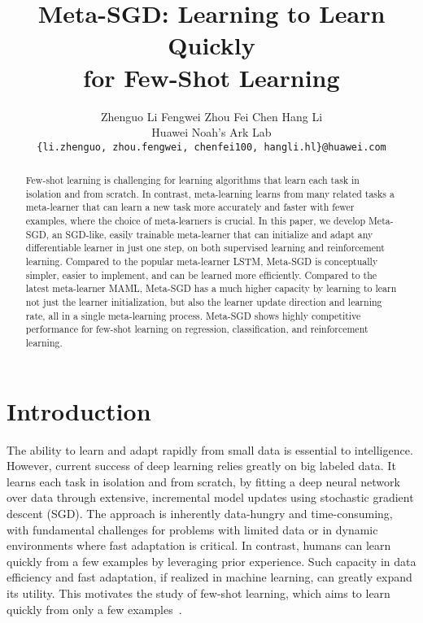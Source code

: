 \documentclass{article}
\title{Meta-SGD: Learning to Learn Quickly\\ for Few-Shot Learning}
\author{
  Zhenguo Li \hspace{0.8cm} Fengwei Zhou \hspace{0.8cm} Fei Chen \hspace{0.8cm} Hang Li 
\\ 
  Huawei Noah's Ark Lab\\
\texttt{\{li.zhenguo, zhou.fengwei, chenfei100, hangli.hl\}@huawei.com} \\
}
\begin{document}
\maketitle



\begin{abstract}
Few-shot learning is challenging for learning algorithms that learn each task in isolation and from scratch. In contrast, meta-learning learns from many related tasks a meta-learner that can learn a new task more accurately and faster with fewer examples, where the choice of meta-learners is crucial.
In this paper, we develop Meta-SGD, an SGD-like, easily trainable meta-learner that can initialize and adapt any differentiable learner in just one step, on both supervised learning and reinforcement learning. Compared to the popular meta-learner LSTM, Meta-SGD is conceptually simpler, easier to implement, and can be learned more efficiently. Compared to the latest meta-learner MAML, Meta-SGD has a much higher capacity by learning to learn not just the learner initialization, but also the learner update direction and learning rate, all in a single meta-learning process.
Meta-SGD shows highly competitive performance for few-shot learning on regression, classification, and reinforcement learning.
\end{abstract}

 \section{Introduction}

The ability to learn and adapt rapidly from small data is essential to intelligence. However,
current success of deep learning relies greatly on big labeled data.
It learns each task in isolation and from scratch, by fitting a deep neural network over data
through extensive, incremental model updates using stochastic gradient descent (SGD). The approach is inherently data-hungry and time-consuming, with fundamental challenges for problems with limited data or in dynamic environments where fast adaptation is critical.
In contrast, humans can learn quickly from a few examples
by leveraging prior experience. Such capacity in data efficiency and fast adaptation, if realized in machine learning, can greatly expand its utility. This motivates the study of few-shot learning, which aims to learn quickly from only a few examples~\cite{lake2016building}.
\end{document}
